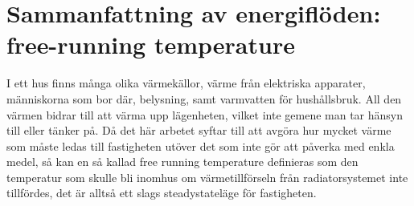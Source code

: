 \section{Sammanfattning av energiflöden: free-running temperature}
\label{sec:freerunningtemp}
I ett hus finns många olika värmekällor, värme från elektriska apparater, människorna som bor där, belysning, samt varmvatten för hushållsbruk. All den värmen bidrar till att värma upp lägenheten, vilket inte gemene man tar hänsyn till eller tänker på. Då det här arbetet syftar till att avgöra hur mycket värme som måste ledas till fastigheten utöver det som inte gör att påverka med enkla medel, så kan en så kallad free running temperature definieras som den temperatur som skulle bli inomhus om värmetillförseln från radiatorsystemet inte tillfördes, det är alltså ett slags steadystateläge för fastigheten.
